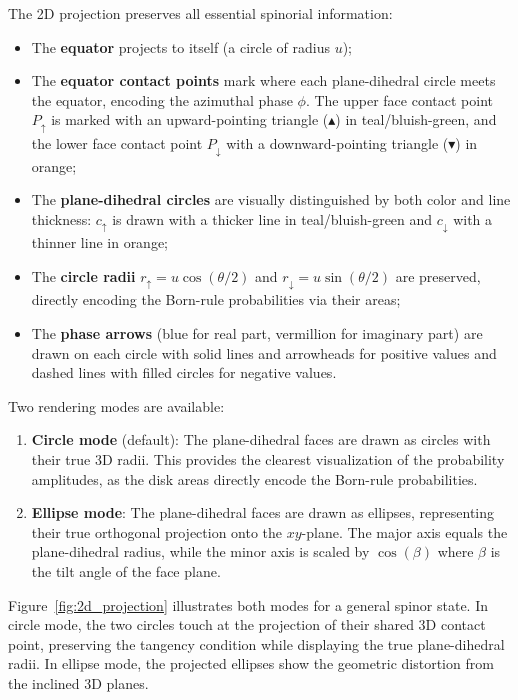 The 2D projection preserves all essential spinorial information:
\begin{itemize}
    \item The \textbf{equator} projects to itself (a circle of radius $u$);
    \item The \textbf{equator contact points} mark where each plane-dihedral circle meets the equator, encoding the azimuthal phase $\phi$. The upper face contact point $P_\uparrow$ is marked with an upward-pointing triangle ($\blacktriangle$) in teal/bluish-green, and the lower face contact point $P_\downarrow$ with a downward-pointing triangle ($\blacktriangledown$) in orange;
    \item The \textbf{plane-dihedral circles} are visually distinguished by both color and line thickness: $c_\uparrow$ is drawn with a thicker line in teal/bluish-green and $c_\downarrow$ with a thinner line in orange;
    \item The \textbf{circle radii} $r_\uparrow = u\cos(\theta/2)$ and $r_\downarrow = u\sin(\theta/2)$ are preserved, directly encoding the Born-rule probabilities via their areas;
    \item The \textbf{phase arrows} (blue for real part, vermillion for imaginary part) are drawn on each circle with solid lines and arrowheads for positive values and dashed lines with filled circles for negative values.
\end{itemize}

Two rendering modes are available:
\begin{enumerate}
    \item \textbf{Circle mode} (default): The plane-dihedral faces are drawn as circles with their true 3D radii. This provides the clearest visualization of the probability amplitudes, as the disk areas directly encode the Born-rule probabilities.
    \item \textbf{Ellipse mode}: The plane-dihedral faces are drawn as ellipses, representing their true orthogonal projection onto the $xy$-plane. The major axis equals the plane-dihedral radius, while the minor axis is scaled by $\cos(\beta)$ where $\beta$ is the tilt angle of the face plane.
\end{enumerate}

Figure~\ref{fig:2d_projection} illustrates both modes for a general spinor state. In circle mode, the two circles touch at the projection of their shared 3D contact point, preserving the tangency condition while displaying the true plane-dihedral radii. In ellipse mode, the projected ellipses show the geometric distortion from the inclined 3D planes.

